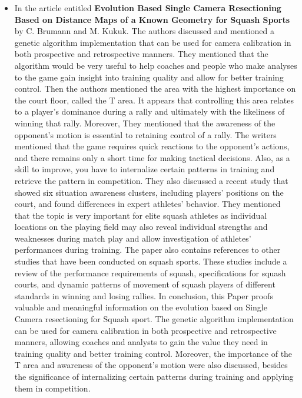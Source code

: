 \documentclass[12pt]{article}
\begin{document}
\begin{itemize}
        \item In the article entitled \textbf{Evolution Based Single Camera Resectioning Based on Distance Maps of a Known Geometry for Squash Sports} \cite{9784855} by C. Brumann and M. Kukuk. The authors discussed and mentioned a genetic algorithm implementation that can be used for camera calibration in both prospective and retrospective manners. They mentioned that the algorithm would be very useful to help coaches and people who make analyses to the game gain insight into training quality and allow for better training control. Then the authors mentioned the area with the highest importance on the court floor, called the T area. It appears that controlling this area relates to a player's dominance during a rally and ultimately with the likeliness of winning that rally. Moreover, They mentioned that the awareness of the opponent's motion is essential to retaining control of a rally. The writers mentioned that the game requires quick reactions to the opponent's actions, and there remains only a short time for making tactical decisions. Also, as a skill to improve, you have to internalize certain patterns in training and retrieve the pattern in competition. They also discussed a recent study that showed six situation awareness clusters, including players' positions on the court, and found differences in expert athletes' behavior. They mentioned that the topic is very important for elite squash athletes as individual locations on the playing field may also reveal individual strengths and weaknesses during match play and allow investigation of athletes' performances during training. The paper also contains references to other studies that have been conducted on squash sports. These studies include a review of the performance requirements of squash, specifications for squash courts, and dynamic patterns of movement of squash players of different standards in winning and losing rallies. In conclusion, this Paper proofs valuable and meaningful information on the evolution based on Single Camera resectioning for Squash sport. The genetic algorithm implementation can be used for camera calibration in both prospective and retrospective manners, allowing coaches and analysts to gain the value they need in training quality and better training control. Moreover, the importance of the T area and awareness of the opponent's motion were also discussed, besides the significance of internalizing certain patterns during training and applying them in competition. 


\end{itemize}
\end{document}
